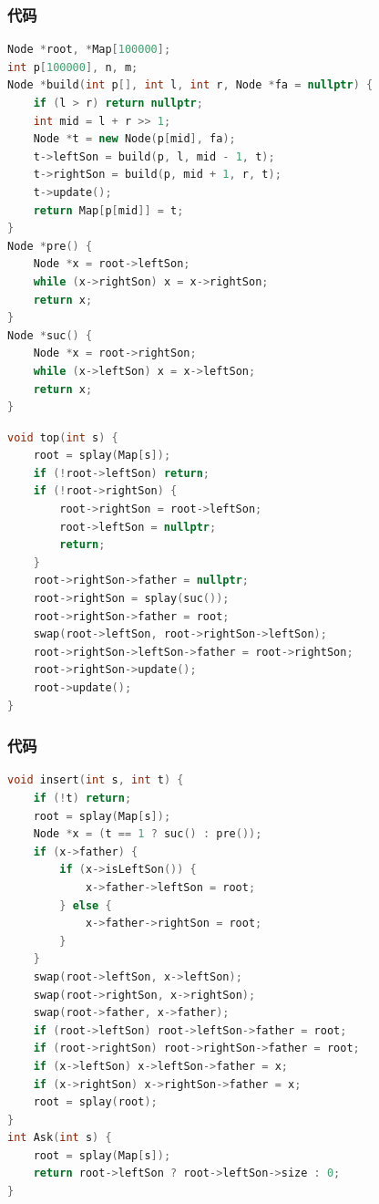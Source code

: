 \documentclass[utf8]{ctexbeamer}
\begin{document}
    \begin{frame}[fragile]
        \frametitle{代码}
        \begin{lstlisting}[language=c++]
Node *root, *Map[100000];
int p[100000], n, m;
Node *build(int p[], int l, int r, Node *fa = nullptr) {
    if (l > r) return nullptr;
    int mid = l + r >> 1;
    Node *t = new Node(p[mid], fa);
    t->leftSon = build(p, l, mid - 1, t);
    t->rightSon = build(p, mid + 1, r, t);
    t->update();
    return Map[p[mid]] = t;
}
Node *pre() {
    Node *x = root->leftSon;
    while (x->rightSon) x = x->rightSon;
    return x;
}
Node *suc() {
    Node *x = root->rightSon;
    while (x->leftSon) x = x->leftSon;
    return x;
}
        \end{lstlisting}
    \end{frame}

    \begin{frame}[fragile]
        \begin{lstlisting}[language=c++]
void top(int s) {
    root = splay(Map[s]);
    if (!root->leftSon) return;
    if (!root->rightSon) {
        root->rightSon = root->leftSon;
        root->leftSon = nullptr;
        return; 
    }
    root->rightSon->father = nullptr;
    root->rightSon = splay(suc());
    root->rightSon->father = root;
    swap(root->leftSon, root->rightSon->leftSon);
    root->rightSon->leftSon->father = root->rightSon;
    root->rightSon->update();
    root->update();
}
        \end{lstlisting}
    \end{frame}

    \begin{frame}[fragile]
        \frametitle{代码}
        \begin{lstlisting}[language=c++]
void insert(int s, int t) {
    if (!t) return;
    root = splay(Map[s]);
    Node *x = (t == 1 ? suc() : pre());
    if (x->father) {
        if (x->isLeftSon()) {
            x->father->leftSon = root;
        } else {
            x->father->rightSon = root;
        }
    }
    swap(root->leftSon, x->leftSon);
    swap(root->rightSon, x->rightSon);
    swap(root->father, x->father);
    if (root->leftSon) root->leftSon->father = root;
    if (root->rightSon) root->rightSon->father = root;
    if (x->leftSon) x->leftSon->father = x;
    if (x->rightSon) x->rightSon->father = x;
    root = splay(root);
}
int Ask(int s) {
    root = splay(Map[s]);
    return root->leftSon ? root->leftSon->size : 0;
}
        \end{lstlisting}
    \end{frame}
\end{document}
